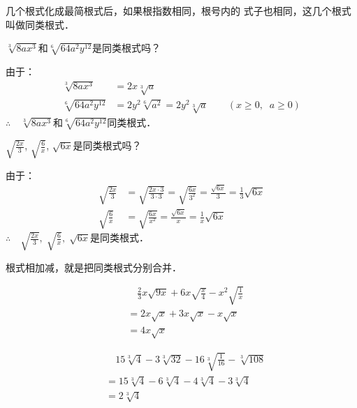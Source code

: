 几个根式化成最简根式后，如果根指数相同，根号内的
式子也相同，这几个根式叫做同类根式．


\begin{example}
    $\sqrt[3]{8ax^3}$和$\sqrt[6]{64a^2y^{12}}$是同类根式吗？
\end{example}
    
\begin{solution}
    由于：
\[\begin{split}
    \sqrt[3]{8ax^3}&=2x\sqrt[3]{a}\\
    \sqrt[6]{64a^2y^{12}}&=2y^2\sqrt[6]{a^2}=2y^2\sqrt[3]{a}\qquad (x\ge 0,\;\; a\ge 0)
\end{split}\]    
    $\therefore\quad \sqrt[3]{8ax^3}$和$\sqrt[6]{64a^2y^{12}}$同类根式．
\end{solution}


\begin{example}
    $\sqrt{\frac{2x}{3}}$, $\sqrt{\frac{6}{x}}$, $\sqrt{6x}$是同类根式吗？
\end{example}


\begin{solution}
    由于：
\[\begin{split}
    \sqrt{\frac{2x}{3}}&=\sqrt{\frac{2x\cdot 3}{3\cdot 3}}=\sqrt{\frac{6x}{3^2}}=\frac{\sqrt{6x}}{3}=\frac{1}{3}\sqrt{6x} \\
    \sqrt{\frac{6}{x}}&= \sqrt{\frac{6x}{x^2}}=\frac{\sqrt{6x}}{x}=\frac{1}{x}\sqrt{6x}
\end{split}\]    
    $\therefore\quad \sqrt{\frac{2x}{3}},\; \sqrt{\frac{6}{x}},\;  \sqrt{6x}$是同类根式．
\end{solution}

根式相加减，就是把同类根式分别合并．


\begin{example}
    \[\begin{split}
       &\quad  \frac{2}{3}x\sqrt{9x}+6x\sqrt{\frac{x}{4}}-x^2\sqrt{\frac{1}{x}}\\
&=2x\sqrt{x}+3x\sqrt{x}-x\sqrt{x}\\
&=4x\sqrt{x}
    \end{split}\]
\end{example}
    
\begin{example}
    \[\begin{split}
        &\quad 15\sqrt[3]{4}-3\sqrt[3]{32}-16\sqrt[3]{\frac{1}{16}}-\sqrt[3]{108}\\
        &=15\sqrt[3]{4}-6\sqrt[3]{4}-4\sqrt[3]{4}-3\sqrt[3]{4}\\
        &=2\sqrt[3]{4}
    \end{split}\] 
\end{example}

